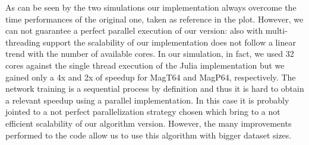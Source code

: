 \documentclass{standalone}
\begin{document}
As can be seen by the two simulations our implementation always overcome the time performances of the original one, taken as reference in the plot.
However, we can not guarantee a perfect parallel execution of our version: also with multi-threading support the scalability of our implementation does not follow a linear trend with the number of available cores.
In our simulation, in fact, we used 32 cores against the single thread execution of the Julia implementation but we gained only a 4x and 2x of speedup for MagT64 and MagP64, respectively.
The network training is a sequential process by definition and thus it is hard to obtain a relevant speedup using a parallel implementation.
In this case it is probably jointed to a not perfect parallelization strategy chosen which bring to a not efficient scalability of our algorithm version.
However, the many improvements performed to the code allow us to use this algorithm with bigger dataset sizes.
\end{document}
